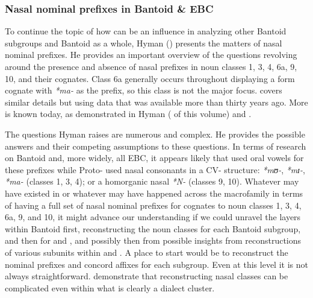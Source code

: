 \documentclass[output=paper]{langsci/langscibook}
\begin{document}
\subsubsection{Nasal nominal prefixes in Bantoid \& EBC}

To continue the topic of how  can be an influence in analyzing other Bantoid subgroups and Bantoid as a whole, Hyman () presents the matters of  nasal nominal prefixes. He provides an important overview of the questions revolving around the presence and absence of nasal prefixes in  noun classes 1, 3, 4, 6a, 9, 10, and their cognates. Class 6a generally occurs throughout  displaying a form cognate with \textit{*ma-} as the prefix, so this class is not the major focus. \citet{Hyman1980borderland} covers similar details but using data that was available more than thirty years ago. More is known today, as demonstrated in Hyman ( of this volume) and \citet{Blench2015}.

  The questions Hyman raises are numerous and complex. He provides the possible answers and their competing assumptions to these questions. In terms of research on Bantoid and, more widely, all EBC, it appears likely that  used oral vowels for these prefixes while Proto- used nasal consonants in a CV- structure: \textit{*mʊ}\textit{{}-}, \textit{*mɪ}\textit{{}-}, \textit{*ma-} (classes 1, 3, 4); or a homorganic nasal \textit{*N-} (classes 9, 10). Whatever may have existed in  or whatever may have happened across the  macrofamily in terms of having a full set of nasal nominal prefixes for cognates to  noun classes 1, 3, 4, 6a, 9, and 10, it might advance our understanding if we could unravel the layers within Bantoid first, reconstructing the noun classes for each Bantoid subgroup, and then for  and , and possibly then from possible insights from reconstructions of various subunits within  and . A place to start would be to reconstruct the nominal prefixes and concord affixes for each  subgroup. Even at this level it is not always straightforward.   \citet{GoodLovegren2017} demonstrate that reconstructing nasal classes can be complicated even within what is clearly a dialect cluster.
\end{document}
